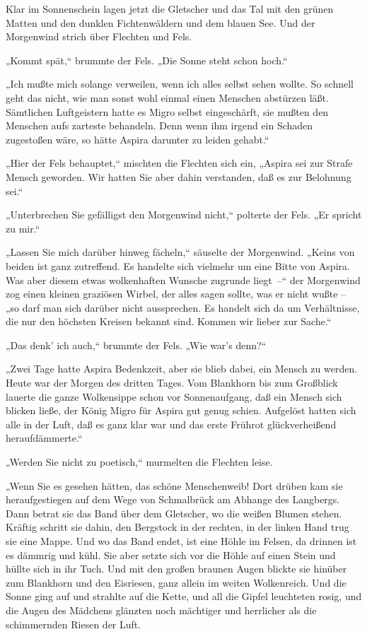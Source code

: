 Klar im Sonnenschein lagen jetzt die Gletscher und das Tal mit den
grünen Matten und den dunklen Fichtenwäldern und dem blauen See.
Und der Morgenwind strich über Flechten und Fels.

„Kommt spät,“ brummte der Fels. „Die Sonne steht schon hoch.“

„Ich mußte mich solange verweilen, wenn ich alles selbst sehen
wollte. So schnell geht das nicht, wie man sonst wohl einmal einen
Menschen abstürzen läßt. Sämtlichen Luftgeistern hatte es Migro
selbst eingeschärft, sie mußten den Menschen aufs zarteste
behandeln. Denn wenn ihm irgend ein Schaden zugestoßen wäre, so
hätte Aspira darunter zu leiden gehabt.“

„Hier der Fels behauptet,“ mischten die Flechten sich ein, „Aspira
sei zur Strafe Mensch geworden. Wir hatten Sie aber dahin
verstanden, daß es zur Belohnung sei.“

„Unterbrechen Sie gefälligst den Morgenwind nicht,“ polterte der
Fels. „Er spricht zu mir.“

„Lassen Sie mich darüber hinweg fächeln,“ säuselte der Morgenwind.
„Keins von beiden ist ganz zutreffend. Es handelte sich vielmehr um
eine Bitte von Aspira. Was aber diesem etwas wolkenhaften Wunsche
zugrunde liegt~–“ der Morgenwind zog einen kleinen graziösen
Wirbel, der alles sagen sollte, was er nicht wußte – „so darf man
sich darüber nicht aussprechen. Es handelt sich da um Verhältnisse,
die nur den höchsten Kreisen bekannt sind. Kommen wir lieber zur
Sache.“

„Das denk' ich auch,“ brummte der Fels. „Wie war's denn?“

„Zwei Tage hatte Aspira Bedenkzeit, aber sie blieb dabei, ein
Mensch zu werden. Heute war der Morgen des dritten Tages. Vom
Blankhorn bis zum Großblick lauerte die ganze Wolkensippe schon vor
Sonnenaufgang, daß ein Mensch sich blicken ließe, der König Migro
für Aspira gut genug schien. Aufgelöst hatten sich alle in der
Luft, daß es ganz klar war und das erste Frührot glückverheißend
heraufdämmerte.“

„Werden Sie nicht zu poetisch,“ murmelten die Flechten leise.

„Wenn Sie es gesehen hätten, das schöne Menschenweib! Dort drüben
kam sie heraufgestiegen auf dem Wege von Schmalbrück am Abhange des
Langbergs. Dann betrat sie das Band über dem Gletscher, wo die
weißen Blumen stehen. Kräftig schritt sie dahin, den Bergstock in
der rechten, in der linken Hand trug sie eine Mappe. Und wo das
Band endet, ist eine Höhle im Felsen, da drinnen ist es dämmrig und
kühl. Sie aber setzte sich vor die Höhle auf einen Stein und hüllte
sich in ihr Tuch. Und mit den großen braunen Augen blickte sie
hinüber zum Blankhorn und den Eisriesen, ganz allein im weiten
Wolkenreich. Und die Sonne ging auf und strahlte auf die Kette, und
all die Gipfel leuchteten rosig, und die Augen des Mädchens
glänzten noch mächtiger und herrlicher als die schimmernden Riesen
der Luft.

